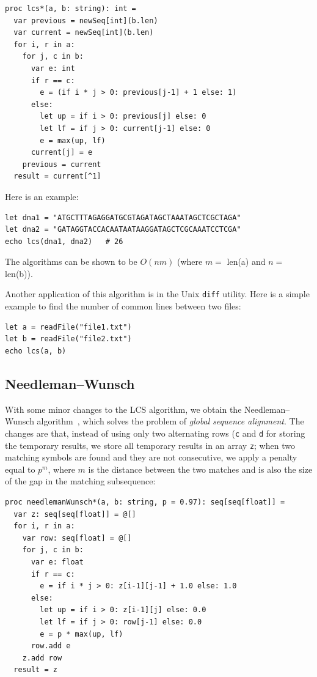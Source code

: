 \documentclass[justified, sixbynine]{tufte-book}
\def\ft{\small\tt}
\theoremstyle{plain}%
\newtheorem * {corollary}{Corollary}
\theoremstyle{definition}
\theoremstyle{remark}
\newtheorem * {remark}{Remark}
\newtheorem * {note}{Note}
\begin{document}
\begin{fullwidth}
\begin{lstlisting}[caption={in file: {\ft nlib.nim}}]
proc lcs*(a, b: string): int =
  var previous = newSeq[int](b.len)
  var current = newSeq[int](b.len)
  for i, r in a:
    for j, c in b:
      var e: int
      if r == c:
        e = (if i * j > 0: previous[j-1] + 1 else: 1)
      else:
        let up = if i > 0: previous[j] else: 0
        let lf = if j > 0: current[j-1] else: 0
        e = max(up, lf)
      current[j] = e
    previous = current
  result = current[^1]
\end{lstlisting}

Here is an example:

\begin{lstlisting}
let dna1 = "ATGCTTTAGAGGATGCGTAGATAGCTAAATAGCTCGCTAGA"
let dna2 = "GATAGGTACCACAATAATAAGGATAGCTCGCAAATCCTCGA"
echo lcs(dna1, dna2)   # 26
\end{lstlisting}

The algorithms can be shown to be $O(nm)$ (where $m=$ len(a) and $n=$ len(b)).

Another application of this algorithm is in the Unix {\ft diff} utility. Here is a simple example to find the number of common lines between two files:

\begin{lstlisting}
let a = readFile("file1.txt")
let b = readFile("file2.txt")
echo lcs(a, b)
\end{lstlisting}

\subsection{Needleman--Wunsch}


With some minor changes to the LCS algorithm, we obtain the Needleman--Wunsch algorithm~\cite{needleman}, which solves the problem of {\it global sequence alignment}. The changes are that, instead of using only two alternating rows ({\ft c} and {\ft d} for storing the temporary results, we store all temporary results in an array {\ft z}; when two matching symbols are found and they are not consecutive, we apply a penalty equal to $p^m$, where $m$ is the distance between the two matches and is also the size of the gap in the matching subsequence:


\begin{lstlisting}[caption={in file: {\ft nlib.nim}}]
proc needlemanWunsch*(a, b: string, p = 0.97): seq[seq[float]] =
  var z: seq[seq[float]] = @[]
  for i, r in a:
    var row: seq[float] = @[]
    for j, c in b:
      var e: float
      if r == c:
        e = if i * j > 0: z[i-1][j-1] + 1.0 else: 1.0
      else:
        let up = if i > 0: z[i-1][j] else: 0.0
        let lf = if j > 0: row[j-1] else: 0.0
        e = p * max(up, lf)
      row.add e
    z.add row
  result = z
\end{lstlisting}


\end{fullwidth}
\end{document}
